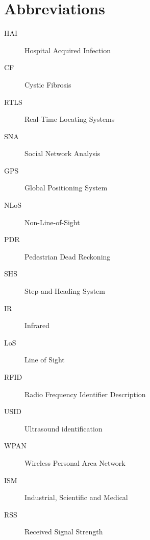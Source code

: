 \chapter*{Abbreviations}\label{abbr}
\begin{description}
\item[HAI] Hospital Acquired Infection
\item[CF] Cystic Fibrosis
\item[RTLS] Real-Time Locating Systems 
\item[SNA] Social Network Analysis
\item[GPS] Global Positioning System
\item[NLoS] Non-Line-of-Sight
\item[PDR] Pedestrian Dead Reckoning
\item[SHS] Step-and-Heading System
\item[IR] Infrared
\item[LoS] Line of Sight
\item[RFID] Radio Frequency Identifier Description
\item[USID] Ultrasound identification
\item[WPAN] Wireless Personal Area Network
\item[ISM] Industrial, Scientific and Medical
\item[RSS] Received Signal Strength
\end{description}